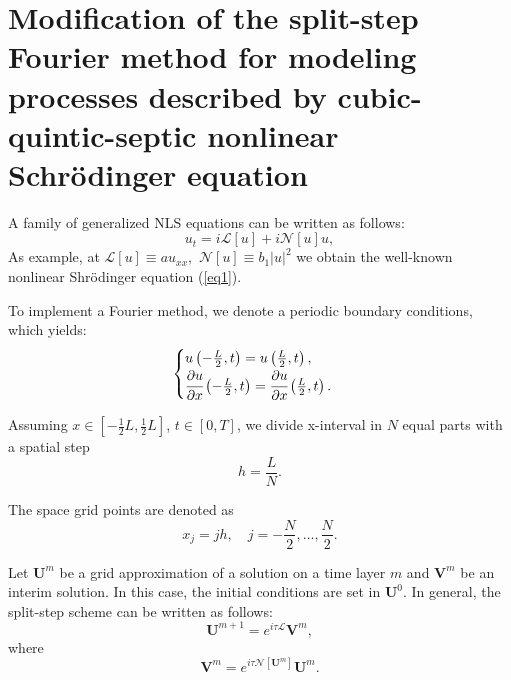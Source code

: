 \documentclass[preprint,12pt]{elsarticle}
\begin{document}
\section{Modification of the split-step Fourier method for modeling processes described by cubic-quintic-septic nonlinear Schr\"{o}dinger equation}\label{ch3}

A family of generalized NLS equations can be written as follows:
\begin{equation}
u_{t}=i\mathscr{L} [u]+i\mathscr{N}[u]u,
\end{equation}
As example, at \(\mathscr{L} [u] \equiv a u_{xx},  \,\,  \mathscr{N} [u] \equiv b_{1} |u|^2\) we obtain the well-known nonlinear Shr\"{o}dinger equation (\ref{eq1}).

To implement a Fourier method, we denote a periodic boundary conditions, which yields:
\begin{equation} \label{eq30}
\begin{aligned}
\begin{cases}
u\left(-\frac{L}{2},t\right)=u\left(\frac{L}{2},t\right),\\
\cfrac{\partial u}{\partial x}\left(-\frac{L}{2},t\right)=\cfrac{\partial u}{\partial x}\left(\frac{L}{2},t\right).
\end{cases}
\end{aligned}
\end{equation}

Assuming \( x \in [-\frac{1}{2} L, \frac{1}{2} L]\), \( t \in [0, T]\), we divide x-interval in \(N\) equal parts with a spatial step
\begin{equation}
h=\frac{L}{N}.
\end{equation}

The space grid points are denoted as
\begin{equation}
x_{j}=jh, \quad j= -\frac{N}{2}, \ldots , \frac{N}{2}.
\end{equation}

Let \(\boldsymbol{U}^{m}\) be a grid approximation of a solution on a time layer \(m\) and \(\boldsymbol{V}^{m}\) be an interim solution. In this case, the initial conditions are set in \(\boldsymbol{U}^{0}\). In general, the split-step scheme can be written as follows\cite{Rad1}:
\begin{equation}\label{eq34}
\boldsymbol{U}^{m+1}=e^{i\tau\mathscr{L}}\boldsymbol{V}^m,
\end{equation}
where
\begin{equation}\label{eq33}
\boldsymbol{V}^m=e^{i\tau\mathscr{N}[\boldsymbol{U}^m]}\boldsymbol{U}^m.
\end{equation}
\end{document}

